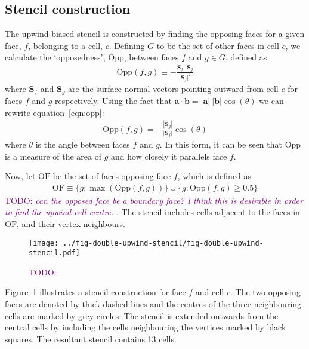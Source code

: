 \documentclass{article}
\newcommand{\TODO}[1]{\textcolor{purple}{TODO: \emph{#1}}}
\begin{document}
\subsection{Stencil construction}
The upwind-biased stencil is constructed by finding the opposing faces for a given face, $f$, belonging to a cell, $c$.  Defining $G$ to be the set of other faces in cell $c$, we calculate the `opposedness', $\mathrm{Opp}$, between faces $f$ and $g \in G$, defined as
\begin{align}
	\mathrm{Opp}(f, g) \equiv - \frac{\mathbf{S}_f \cdot \mathbf{S}_g}{|\mathbf{S}_f|^2} \label{eqn:opp}
\end{align}
where $\mathbf{S}_f$ and $\mathbf{S}_g$ are the surface normal vectors pointing outward from cell $c$ for faces $f$ and $g$ respectively.
Using the fact that $\mathbf{a} \cdot \mathbf{b} = |\mathbf{a}|\:|\mathbf{b}| \cos(\theta)$ we can rewrite equation~\ref{eqn:opp}:
\begin{align}
	\mathrm{Opp}(f, g) = - \frac{|\mathbf{S}_g|}{|\mathbf{S}_f|} \cos(\theta)
\end{align}
where $\theta$ is the angle between faces $f$ and $g$.  In this form, it can be seen that $\mathrm{Opp}$ is a measure of the area of $g$ and how closely it parallels face $f$.

Now, let $\mathrm{OF}$ be the set of faces opposing face $f$, which is defined as
\begin{align}
	\mathrm{OF} \equiv \{ g : \max(\mathrm{Opp}(f, g)) \} \cup \{ g : \mathrm{Opp}(f, g) \geq 0.5 \}
\end{align}
\TODO{can the opposed face be a boundary face?  I think this is desirable in order to find the upwind cell centre...}
The stencil includes cells adjacent to the faces in $\mathrm{OF}$, and their vertex neighbours.

\begin{figure}
	\centering
	\texttt{[image: ../fig-double-upwind-stencil/fig-double-upwind-stencil.pdf]}
	\caption{\TODO{}}
	\label{fig:double-upwind-stencil}
\end{figure}

Figure~\ref{fig:double-upwind-stencil} illustrates a stencil construction for face $f$ and cell $c$.  The two opposing faces are denoted by thick dashed lines and the centres of the three neighbouring cells are marked by grey circles.  The stencil is extended outwards from the central cells by including the cells neighbouring the vertices marked by black squares.  The resultant stencil contains 13 cells.
\end{document}
